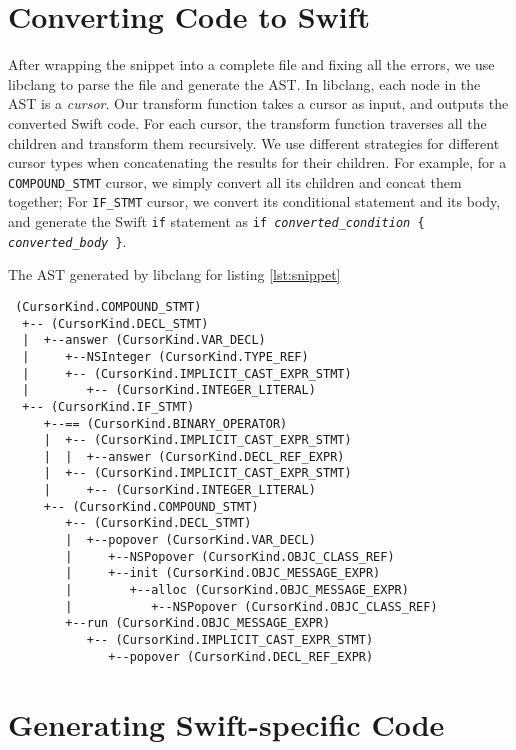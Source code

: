 \documentclass{sfuthesis}
\begin{document}


\section{Converting Code to Swift}

After wrapping the snippet into a complete file and fixing all the errors, we use libclang to parse the file and generate the AST. In libclang, each node in the AST is a \emph{cursor}. Our transform function takes a cursor as input, and outputs the converted Swift code. For each cursor, the transform function traverses all the children and transform them recursively. We use different strategies for different cursor types when concatenating the results for their children. For example, for a \texttt{COMPOUND\_STMT} cursor, we simply convert all its children and concat them together; For \texttt{IF\_STMT} cursor, we convert its conditional statement and its body, and generate the Swift \texttt{if} statement as \texttt{if \emph{converted\_condition} \{ \emph{converted\_body} \}}.

\begin{listing}[H]
\caption{The AST generated by libclang for listing \ref{lst:snippet}}
\begin{verbatim}
 (CursorKind.COMPOUND_STMT)
  +-- (CursorKind.DECL_STMT)
  |  +--answer (CursorKind.VAR_DECL)
  |     +--NSInteger (CursorKind.TYPE_REF)
  |     +-- (CursorKind.IMPLICIT_CAST_EXPR_STMT)
  |        +-- (CursorKind.INTEGER_LITERAL)
  +-- (CursorKind.IF_STMT)
     +--== (CursorKind.BINARY_OPERATOR)
     |  +-- (CursorKind.IMPLICIT_CAST_EXPR_STMT)
     |  |  +--answer (CursorKind.DECL_REF_EXPR)
     |  +-- (CursorKind.IMPLICIT_CAST_EXPR_STMT)
     |     +-- (CursorKind.INTEGER_LITERAL)
     +-- (CursorKind.COMPOUND_STMT)
        +-- (CursorKind.DECL_STMT)
        |  +--popover (CursorKind.VAR_DECL)
        |     +--NSPopover (CursorKind.OBJC_CLASS_REF)
        |     +--init (CursorKind.OBJC_MESSAGE_EXPR)
        |        +--alloc (CursorKind.OBJC_MESSAGE_EXPR)
        |           +--NSPopover (CursorKind.OBJC_CLASS_REF)
        +--run (CursorKind.OBJC_MESSAGE_EXPR)
           +-- (CursorKind.IMPLICIT_CAST_EXPR_STMT)
              +--popover (CursorKind.DECL_REF_EXPR)
\end{verbatim}
\end{listing}

\section{Generating Swift-specific Code}
\end{document}
